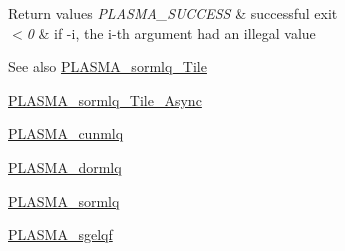 \begin{DoxyRetVals}{Return values}
{\em P\+L\+A\+S\+M\+A\+\_\+\+S\+U\+C\+C\+E\+S\+S} & successful exit \\
\hline
{\em $<$0} & if -\/i, the i-\/th argument had an illegal value\\
\hline
\end{DoxyRetVals}
\begin{DoxySeeAlso}{See also}
\hyperlink{group__float__Tile_ga8033d8163163f2681562008e5f4a3ccb_ga8033d8163163f2681562008e5f4a3ccb}{P\+L\+A\+S\+M\+A\+\_\+sormlq\+\_\+\+Tile} 

\hyperlink{group__float__Tile__Async_ga4fb93ad68adf32cbd022eeaa0b55ba7b_ga4fb93ad68adf32cbd022eeaa0b55ba7b}{P\+L\+A\+S\+M\+A\+\_\+sormlq\+\_\+\+Tile\+\_\+\+Async} 

\hyperlink{group__PLASMA__Complex32__t_gac9aca2d8444a6e5630fe4674505a2afd_gac9aca2d8444a6e5630fe4674505a2afd}{P\+L\+A\+S\+M\+A\+\_\+cunmlq} 

\hyperlink{group__double_ga7c70d5b53e69f9ab564126c78938002a_ga7c70d5b53e69f9ab564126c78938002a}{P\+L\+A\+S\+M\+A\+\_\+dormlq} 

\hyperlink{group__float_ga4f42eb41e34bdf290b36fe5ce8e576b7_ga4f42eb41e34bdf290b36fe5ce8e576b7}{P\+L\+A\+S\+M\+A\+\_\+sormlq} 

\hyperlink{group__float_gaecbccf81ab27bc4a0a5913baedf3b7ef_gaecbccf81ab27bc4a0a5913baedf3b7ef}{P\+L\+A\+S\+M\+A\+\_\+sgelqf} 
\end{DoxySeeAlso}
\hypertarget{group__float_ga3d2c263d860db4a6d63fd13156262bd2_ga3d2c263d860db4a6d63fd13156262bd2}{}

